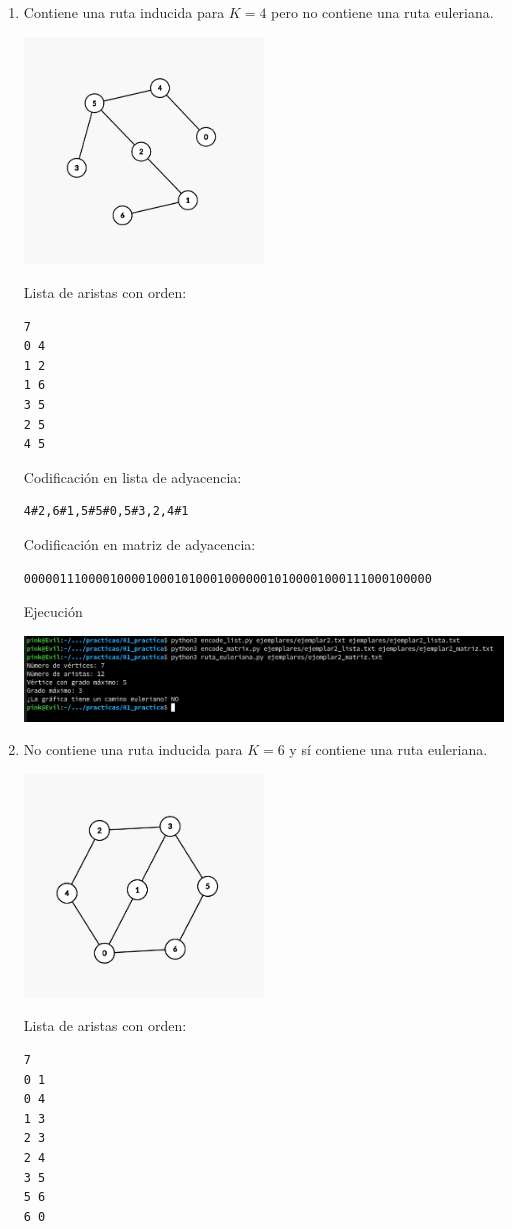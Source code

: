 \documentclass[11pt]{article}
\begin{document}
\begin{enumerate}
\item Contiene una ruta inducida para $K = 4$ pero no contiene una ruta
  euleriana.
  \begin{center}
    \includegraphics[width=0.5\textwidth]{ejemplar2.png}
  \end{center}
Lista de aristas con orden:
\begin{verbatim}
7
0 4
1 2
1 6
3 5
2 5
4 5
\end{verbatim}

Codificación en lista de adyacencia:
\begin{verbatim}
4#2,6#1,5#5#0,5#3,2,4#1
\end{verbatim}

Codificación en matriz de adyacencia:
\begin{verbatim}
000001110000100001000101000100000010100001000111000100000
\end{verbatim}

Ejecución
\begin{center}
  \includegraphics[width=\textwidth]{ejecucion2.png}
\end{center}


\item No contiene una ruta inducida para $K = 6$ y sí contiene una ruta euleriana.
  \begin{center}
    \includegraphics[width=0.5\textwidth]{ejemplar3.png}
  \end{center}
Lista de aristas con orden:
\begin{verbatim}
7
0 1
0 4
1 3
2 3
2 4
3 5
5 6
6 0
\end{verbatim}


\end{enumerate}
\end{document}
